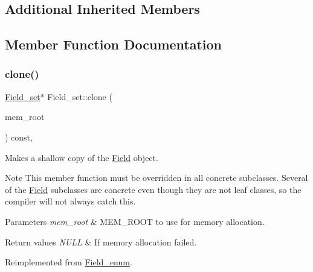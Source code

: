 \subsection*{Additional Inherited Members}


\subsection{Member Function Documentation}
\mbox{\label{classField__set_a6fa7de649f03776a9047b06bc404cee4}} 
\subsubsection{\texorpdfstring{clone()}{clone()}\hspace{0.1cm}{\footnotesize\ttfamily [1/2]}}
{\footnotesize\ttfamily \mbox{\hyperlink{classField__set}{Field\+\_\+set}}$\ast$ Field\+\_\+set\+::clone (\begin{DoxyParamCaption}\item[{M\+E\+M\+\_\+\+R\+O\+OT $\ast$}]{mem\+\_\+root }\end{DoxyParamCaption}) const\hspace{0.3cm}{\ttfamily [inline]}, {\ttfamily [virtual]}}

Makes a shallow copy of the \mbox{\hyperlink{classField}{Field}} object.

\begin{DoxyNote}{Note}
This member function must be overridden in all concrete subclasses. Several of the \mbox{\hyperlink{classField}{Field}} subclasses are concrete even though they are not leaf classes, so the compiler will not always catch this.
\end{DoxyNote}

\begin{DoxyParams}{Parameters}
{\em mem\+\_\+root} & M\+E\+M\+\_\+\+R\+O\+OT to use for memory allocation. \\
\hline
\end{DoxyParams}

\begin{DoxyRetVals}{Return values}
{\em N\+U\+LL} & If memory allocation failed. \\
\hline
\end{DoxyRetVals}


Reimplemented from \mbox{\hyperlink{classField__enum_a47e937e56eb39c90f99f19379939d9a8}{Field\+\_\+enum}}.

